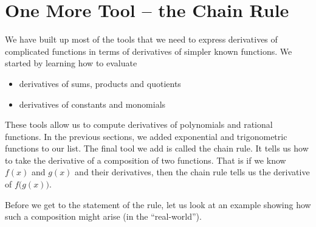 \section{One More Tool  -- the Chain Rule}\label{sec chain rule}

We have built up most of the tools that we need to express derivatives of
complicated functions in terms of derivatives of simpler known functions.
We started by learning how to evaluate
\begin{itemize}
 \item derivatives of sums, products and quotients
 \item derivatives of constants and monomials
\end{itemize}
These tools allow us to compute derivatives of polynomials and
rational functions. In the previous sections, we added exponential and trigonometric
functions to our list. The final tool we add is called the chain rule.
It tells us how to take the derivative of a composition of two functions.
That is if we know $f(x)$ and $g(x)$ and their derivatives, then the chain
rule tells us the derivative of $f\big(g(x)\big)$.

Before we get to the statement of the rule, let us look at an
example showing how such a composition might arise (in the  ``real-world'').

